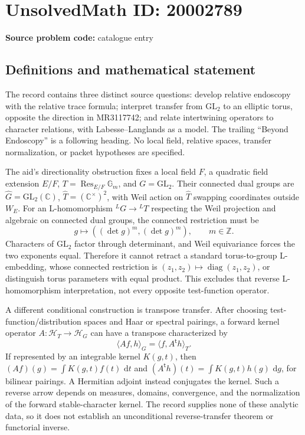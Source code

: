 \documentclass[11pt]{article}
\newcommand{\Z}{\mathbb{Z}}
\newcommand{\C}{\mathbb{C}}
\newcommand{\dd}{\,\mathrm{d}}
\begin{document}
\section*{UnsolvedMath ID: 20002789}
\textbf{Source problem code:} catalogue entry
\subsection{Definitions and mathematical statement}
The record contains three distinct source questions: develop relative endoscopy with the relative trace formula; interpret transfer from \(\mathrm{GL}_2\) to an elliptic torus, opposite the direction in MR3117742; and relate intertwining operators to character relations, with Labesse--Langlands as a model. The trailing ``Beyond Endoscopy'' is a following heading. No local field, relative spaces, transfer normalization, or packet hypotheses are specified.

The aid's directionality obstruction fixes a local field \(F\), a quadratic field extension \(E/F\), \(T=\operatorname{Res}_{E/F}\mathbb G_m\), and \(G=\mathrm{GL}_2\). Their connected dual groups are \(\widehat G=\mathrm{GL}_2(\C)\), \(\widehat T=(\C^\times)^2\), with Weil action on \(\widehat T\) swapping coordinates outside \(W_E\). For an L-homomorphism \({}^LG\to{}^LT\) respecting the Weil projection and algebraic on connected dual groups, the connected restriction must be
\[
 g\longmapsto((\det g)^m,(\det g)^m),\qquad m\in\Z.
\]
Characters of \(\mathrm{GL}_2\) factor through determinant, and Weil equivariance forces the two exponents equal. Therefore it cannot retract a standard torus-to-group L-embedding, whose connected restriction is \((z_1,z_2)\mapsto\operatorname{diag}(z_1,z_2)\), or distinguish torus parameters with equal product. This excludes that reverse L-homomorphism interpretation, not every opposite test-function operator.

A different conditional construction is transpose transfer. After choosing test-function/distribution spaces and Haar or spectral pairings, a forward kernel operator \(A:\mathcal H_T\to\mathcal H_G\) can have a transpose characterized by
\[
 \langle Af,h\rangle_G=\langle f,A^{\mathsf t}h\rangle_T.
\]
If represented by an integrable kernel \(K(g,t)\), then \((Af)(g)=\int K(g,t)f(t)\,\dd t\) and \((A^{\mathsf t}h)(t)=\int K(g,t)h(g)\,\dd g\), for bilinear pairings. A Hermitian adjoint instead conjugates the kernel. Such a reverse arrow depends on measures, domains, convergence, and the normalization of the forward stable-character kernel. The record supplies none of these analytic data, so it does not establish an unconditional reverse-transfer theorem or functorial inverse.
\end{document}
